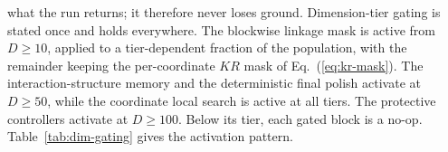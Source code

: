 what the run returns; it therefore never loses ground.
Dimension-tier gating is stated once and holds everywhere.
The blockwise linkage mask is active from $D\ge10$, applied to a
tier-dependent fraction of the population, with the remainder keeping
the per-coordinate $KR$ mask of Eq.~(\ref{eq:kr-mask}).
The interaction-structure memory and the
deterministic final polish activate at $D\ge50$, while the coordinate local search
is active at all tiers. The protective
controllers activate at $D\ge100$. %
Below its tier, each gated block is a no-op.
Table~\ref{tab:dim-gating} gives the activation pattern.

